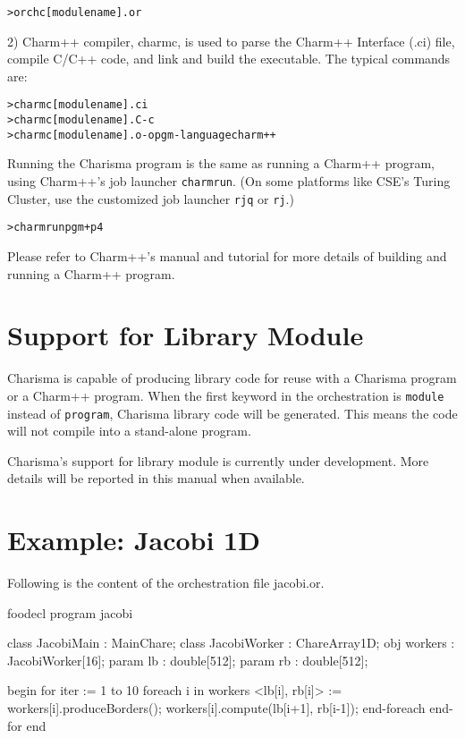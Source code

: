 \documentclass[10pt]{article}
\def\smallfbox#1{{\small \fbox{#1}}}
\def\code#1{{\small {\tt {#1}}}}
\begin{document}
\begin{alltt}
    > orchc [modulename].or
\end{alltt}

2) Charm++ compiler, charmc, is used to parse the Charm++ Interface (.ci) file,
compile C/C++ code, and link and build the executable. The typical commands are:
\begin{alltt}
    > charmc [modulename].ci
    > charmc [modulename].C -c
    > charmc [modulename].o -o pgm -language charm++
\end{alltt}

Running the Charisma program is the same as running a Charm++ program, using
Charm++'s job launcher \code{charmrun}. (On some platforms like CSE's Turing 
Cluster, use the customized job launcher \code{rjq} or \code{rj}.) 

\begin{alltt}
    > charmrun pgm +p4
\end{alltt}

Please refer to Charm++'s manual and tutorial for more details of building 
and running a Charm++ program. 

\section{Support for Library Module}
\label{sec:module}

Charisma is capable of producing library code for reuse with a Charisma program
or a Charm++ program. When the first keyword in the orchestration is
\code{module} instead of \code{program}, Charisma library code will be
generated. This means the code will not compile into a stand-alone program.

Charisma's support for library module is currently under development. More
details will be reported in this manual when available.

\appendix
\label{sec:appendix}

\section{Example: Jacobi 1D}
Following is the content of the orchestration file jacobi.or. 

\begin{SaveVerbatim}{foodecl}
program jacobi

class  JacobiMain : MainChare;
class  JacobiWorker : ChareArray1D;
obj  workers : JacobiWorker[16];
param  lb : double[512];
param  rb : double[512];

begin
    for iter := 1 to 10
	foreach i in workers
	    <lb[i], rb[i]> := workers[i].produceBorders();
	    workers[i].compute(lb[i+1], rb[i-1]);
	end-foreach
    end-for
end
\end{SaveVerbatim}
\vspace{0.1in}
\smallfbox{\BUseVerbatim{foodecl}}
\vspace{0.1in}
\end{document}
